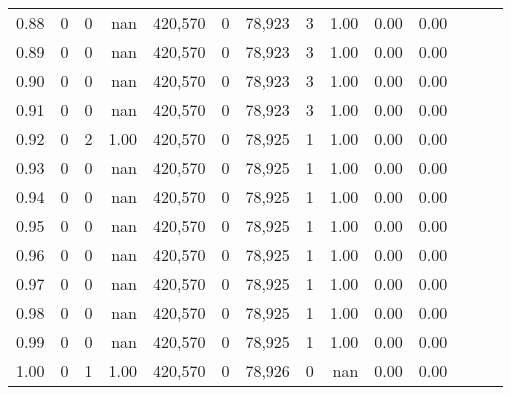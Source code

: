 \begin{tabular}{rrrrrrrrrrrrrr}
0.88 &       0 &      0 &   nan &  420,570 &        0 &  78,923 &       3 &  1.00 &  0.00 &      0.00 \\
0.89 &       0 &      0 &   nan &  420,570 &        0 &  78,923 &       3 &  1.00 &  0.00 &      0.00 \\
0.90 &       0 &      0 &   nan &  420,570 &        0 &  78,923 &       3 &  1.00 &  0.00 &      0.00 \\
0.91 &       0 &      0 &   nan &  420,570 &        0 &  78,923 &       3 &  1.00 &  0.00 &      0.00 \\
0.92 &       0 &      2 &  1.00 &  420,570 &        0 &  78,925 &       1 &  1.00 &  0.00 &      0.00 \\
0.93 &       0 &      0 &   nan &  420,570 &        0 &  78,925 &       1 &  1.00 &  0.00 &      0.00 \\
0.94 &       0 &      0 &   nan &  420,570 &        0 &  78,925 &       1 &  1.00 &  0.00 &      0.00 \\
0.95 &       0 &      0 &   nan &  420,570 &        0 &  78,925 &       1 &  1.00 &  0.00 &      0.00 \\
0.96 &       0 &      0 &   nan &  420,570 &        0 &  78,925 &       1 &  1.00 &  0.00 &      0.00 \\
0.97 &       0 &      0 &   nan &  420,570 &        0 &  78,925 &       1 &  1.00 &  0.00 &      0.00 \\
0.98 &       0 &      0 &   nan &  420,570 &        0 &  78,925 &       1 &  1.00 &  0.00 &      0.00 \\
0.99 &       0 &      0 &   nan &  420,570 &        0 &  78,925 &       1 &  1.00 &  0.00 &      0.00 \\
1.00 &       0 &      1 &  1.00 &  420,570 &        0 &  78,926 &       0 &   nan &  0.00 &      0.00 \\
\bottomrule
\end{tabular}
